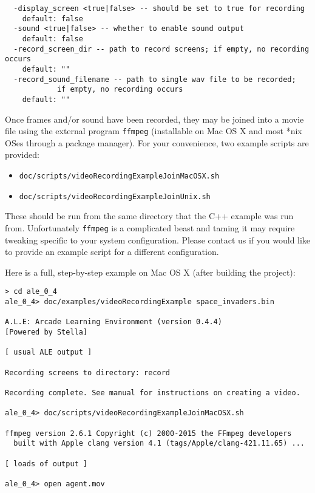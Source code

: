 \documentclass[12pt]{article}
\begin{document}
\small{
\begin{verbatim}
  -display_screen <true|false> -- should be set to true for recording
    default: false
  -sound <true|false> -- whether to enable sound output
    default: false
  -record_screen_dir -- path to record screens; if empty, no recording occurs
    default: ""
  -record_sound_filename -- path to single wav file to be recorded; 
            if empty, no recording occurs
    default: ""
\end{verbatim}
}

Once frames and/or sound have been recorded, they may be joined into a movie file using the external program \texttt{ffmpeg} (installable on Mac OS X and most *nix OSes through a package manager). For your convenience, two example scripts are provided:

\begin{itemize}
    \item{\texttt{doc/scripts/videoRecordingExampleJoinMacOSX.sh}}
    \item{\texttt{doc/scripts/videoRecordingExampleJoinUnix.sh}}
\end{itemize}

These should be run from the same directory that the C++ example was run from. Unfortunately \texttt{ffmpeg} is a complicated beast and taming it may require tweaking specific to your system configuration. Please contact us if you would like to provide an example script for a different configuration.

Here is a full, step-by-step example on Mac OS X (after building the project):
\begin{verbatim}
> cd ale_0_4
ale_0_4> doc/examples/videoRecordingExample space_invaders.bin

A.L.E: Arcade Learning Environment (version 0.4.4)
[Powered by Stella]

[ usual ALE output ]

Recording screens to directory: record

Recording complete. See manual for instructions on creating a video.

ale_0_4> doc/scripts/videoRecordingExampleJoinMacOSX.sh

ffmpeg version 2.6.1 Copyright (c) 2000-2015 the FFmpeg developers
  built with Apple clang version 4.1 (tags/Apple/clang-421.11.65) ... 

[ loads of output ]

ale_0_4> open agent.mov
\end{verbatim}
\end{document}
